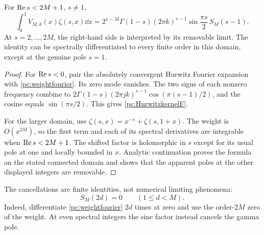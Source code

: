 \begin{theorem}\label{pc:Hurwitzkernel}
For $\operatorname{Re} s<2M+1$, $s\ne1$,
\begin{equation}\label{pc:HurwitzkernelF}
 \int_0^1 V_{M,k}(x)\zeta(s,x)\dd x
 =2^{1-M}\Gamma(1-s)(2\pi k)^{s-1}
                  \sin\frac{\pi s}{2}\,S_M(s-1).
\end{equation}
At $s=2,\ldots,2M$, the right-hand side is interpreted by its removable limit. The identity can be spectrally differentiated to every finite order in this domain, except at the genuine pole $s=1$.
\end{theorem}
\begin{proof}
For $\operatorname{Re} s<0$, pair the absolutely convergent Hurwitz Fourier expansion with \eqref{pc:weightfourier}. Its zero mode vanishes. The two signs of each nonzero frequency combine to
$2\Gamma(1-s)(2\pi jk)^{s-1}\cos(\pi(s-1)/2)$, and the cosine equals $\sin(\pi s/2)$. This gives \eqref{pc:HurwitzkernelF}.

For the larger domain, use $\zeta(s,x)=x^{-s}+\zeta(s,1+x)$. The weight is $O(x^{2M})$, so the first term and each of its spectral derivatives are integrable when $\operatorname{Re} s<2M+1$. The shifted factor is holomorphic in $s$ except for its usual pole at one and locally bounded in $x$. Analytic continuation proves the formula on the stated connected domain and shows that the apparent poles at the other displayed integers are removable.
\end{proof}
The cancellations are finite identities, not numerical limiting phenomena:
\begin{equation}\label{pc:SMzeros}
 S_M(2d)=0\qquad(1\le d<M).
\end{equation}
Indeed, differentiate \eqref{pc:weightfourier} $2d$ times at zero and use the order-$2M$ zero of the weight. At even spectral integers the sine factor instead cancels the gamma pole.

